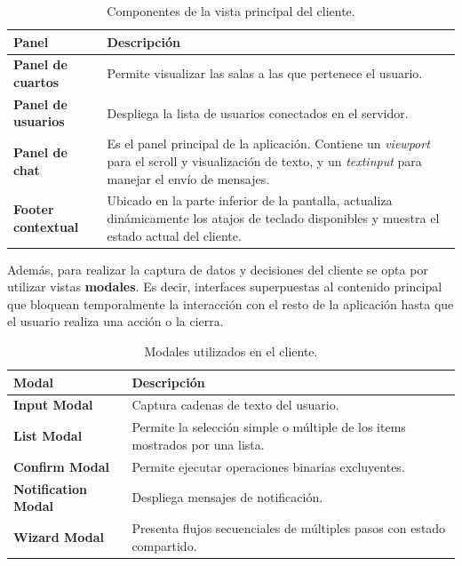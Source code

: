 \begin{table}[h]
    \centering
    \begin{tabular}{lp{11cm}}
        \textbf{Panel} & \textbf{Descripción} \\ \hline
        \textbf{Panel de cuartos} & Permite visualizar las salas a las que pertenece el usuario. \\
        \textbf{Panel de usuarios} & Despliega la lista de usuarios conectados en el servidor. \\
        \textbf{Panel de chat} & Es el panel principal de la aplicación. Contiene un \textit{viewport} para el scroll y visualización de texto, y un \textit{textinput} para manejar el envío de mensajes. \\
        \textbf{Footer contextual} & Ubicado en la parte inferior de la pantalla, actualiza dinámicamente los atajos de teclado disponibles y muestra el estado actual del cliente. \\
    \end{tabular}
    \caption{Componentes de la vista principal del cliente.}
    \label{tab:paneles-cliente}
\end{table}

Además, para realizar la captura de datos y decisiones del cliente se opta por utilizar vistas \textbf{modales}. Es decir, interfaces superpuestas 
al contenido principal que bloquean temporalmente la interacción con el resto de la aplicación hasta que el usuario realiza una acción o la cierra. 

\begin{table}[h]
    \centering
    \begin{tabular}{lp{11cm}}
        \textbf{Modal} & \textbf{Descripción} \\ \hline
        \textbf{Input Modal} & Captura cadenas de texto del usuario. \\
        \textbf{List Modal} & Permite la selección simple o múltiple de los items mostrados por una lista. \\
        \textbf{Confirm Modal} & Permite ejecutar operaciones binarias excluyentes. \\
        \textbf{Notification Modal} & Despliega mensajes de notificación. \\
        \textbf{Wizard Modal} & Presenta flujos secuenciales de múltiples pasos con estado compartido. \\
    \end{tabular}
    \caption{Modales utilizados en el cliente.}
    \label{tab:modales-cliente}
\end{table}

